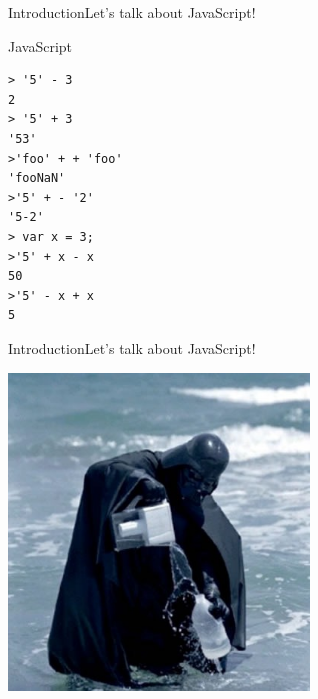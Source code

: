 \documentclass[10pt]{beamer}
\begin{document}
\begin{frame}[fragile]{Introduction}{Let's talk about JavaScript!}
\begin{center}
		
\begin{block}{JavaScript}
			
\begin{lstlisting}
> '5' - 3
2
> '5' + 3
'53'
>'foo' + + 'foo'
'fooNaN'
>'5' + - '2'
'5-2'
> var x = 3;
>'5' + x - x
50
>'5' - x + x
5

\end{lstlisting}
			
			
\end{block}
		
\end{center}
	
\end{frame}

\begin{frame}{Introduction}{Let's talk about JavaScript!}
\begin{center}
	\includegraphics[width=0.6\textwidth]{pictures/wat1.jpg}
\end{center}
\end{frame}
\end{document}
